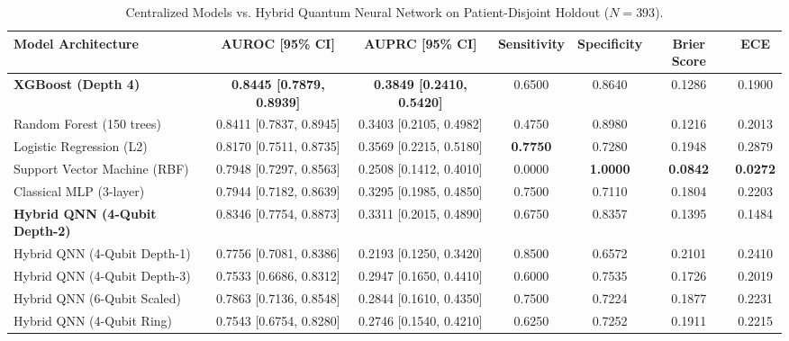 \documentclass{article}
\begin{document}
\begin{table}[htbp]
\centering
\small
\caption{Centralized Models vs. Hybrid Quantum Neural Network on Patient-Disjoint Holdout ($N = 393$).}
\label{tab:model_comparison}
\begin{tabular}{lcccccc}
\toprule
\textbf{Model Architecture} & \textbf{AUROC [95\% CI]} & \textbf{AUPRC [95\% CI]} & \textbf{Sensitivity} & \textbf{Specificity} & \textbf{Brier Score} & \textbf{ECE} \\
\midrule
\textbf{XGBoost (Depth 4)} & \textbf{0.8445 [0.7879, 0.8939]} & \textbf{0.3849 [0.2410, 0.5420]} & 0.6500 & 0.8640 & 0.1286 & 0.1900 \\
Random Forest (150 trees) & 0.8411 [0.7837, 0.8945] & 0.3403 [0.2105, 0.4982] & 0.4750 & 0.8980 & 0.1216 & 0.2013 \\
Logistic Regression (L2) & 0.8170 [0.7511, 0.8735] & 0.3569 [0.2215, 0.5180] & \textbf{0.7750} & 0.7280 & 0.1948 & 0.2879 \\
Support Vector Machine (RBF) & 0.7948 [0.7297, 0.8563] & 0.2508 [0.1412, 0.4010] & 0.0000 & \textbf{1.0000} & \textbf{0.0842} & \textbf{0.0272} \\
Classical MLP (3-layer) & 0.7944 [0.7182, 0.8639] & 0.3295 [0.1985, 0.4850] & 0.7500 & 0.7110 & 0.1804 & 0.2203 \\
\midrule
\textbf{Hybrid QNN (4-Qubit Depth-2)} & 0.8346 [0.7754, 0.8873] & 0.3311 [0.2015, 0.4890] & 0.6750 & 0.8357 & 0.1395 & 0.1484 \\
Hybrid QNN (4-Qubit Depth-1) & 0.7756 [0.7081, 0.8386] & 0.2193 [0.1250, 0.3420] & 0.8500 & 0.6572 & 0.2101 & 0.2410 \\
Hybrid QNN (4-Qubit Depth-3) & 0.7533 [0.6686, 0.8312] & 0.2947 [0.1650, 0.4410] & 0.6000 & 0.7535 & 0.1726 & 0.2019 \\
Hybrid QNN (6-Qubit Scaled) & 0.7863 [0.7136, 0.8548] & 0.2844 [0.1610, 0.4350] & 0.7500 & 0.7224 & 0.1877 & 0.2231 \\
Hybrid QNN (4-Qubit Ring) & 0.7543 [0.6754, 0.8280] & 0.2746 [0.1540, 0.4210] & 0.6250 & 0.7252 & 0.1911 & 0.2215 \\
\bottomrule
\end{tabular}
\end{table}

\vspace{1em}
\end{document}
